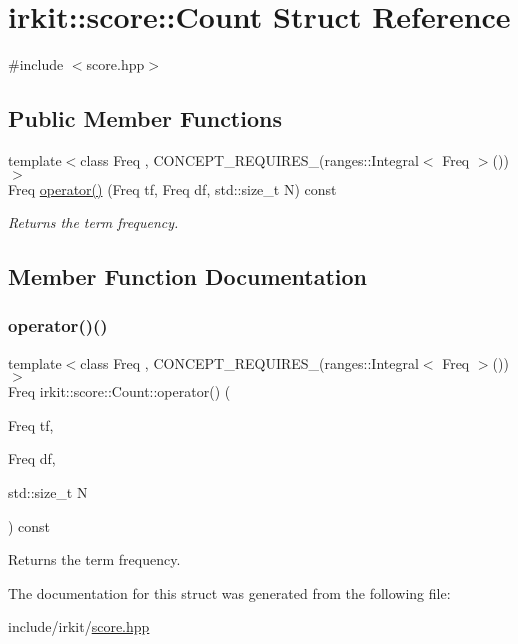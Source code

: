 \hypertarget{structirkit_1_1score_1_1Count}{}\section{irkit\+:\+:score\+:\+:Count Struct Reference}
\label{structirkit_1_1score_1_1Count}


{\ttfamily \#include $<$score.\+hpp$>$}

\subsection*{Public Member Functions}
\begin{DoxyCompactItemize}
\item 
{\footnotesize template$<$class Freq , C\+O\+N\+C\+E\+P\+T\+\_\+\+R\+E\+Q\+U\+I\+R\+E\+S\+\_\+(ranges\+::\+Integral$<$ Freq $>$()) $>$ }\\Freq \mbox{\hyperlink{structirkit_1_1score_1_1Count_a0fa3a6e1c9061f90f44737b3d9debe1e}{operator()}} (Freq tf, Freq df, std\+::size\+\_\+t N) const
\begin{DoxyCompactList}\small\item\em Returns the term frequency. \end{DoxyCompactList}\end{DoxyCompactItemize}


\subsection{Member Function Documentation}
\mbox{\label{structirkit_1_1score_1_1Count_a0fa3a6e1c9061f90f44737b3d9debe1e}} 
\subsubsection{\texorpdfstring{operator()()}{operator()()}}
{\footnotesize\ttfamily template$<$class Freq , C\+O\+N\+C\+E\+P\+T\+\_\+\+R\+E\+Q\+U\+I\+R\+E\+S\+\_\+(ranges\+::\+Integral$<$ Freq $>$()) $>$ \\
Freq irkit\+::score\+::\+Count\+::operator() (\begin{DoxyParamCaption}\item[{Freq}]{tf,  }\item[{Freq}]{df,  }\item[{std\+::size\+\_\+t}]{N }\end{DoxyParamCaption}) const\hspace{0.3cm}{\ttfamily [inline]}}



Returns the term frequency. 



The documentation for this struct was generated from the following file\+:\begin{DoxyCompactItemize}
\item 
include/irkit/\mbox{\hyperlink{score_8hpp}{score.\+hpp}}\end{DoxyCompactItemize}
